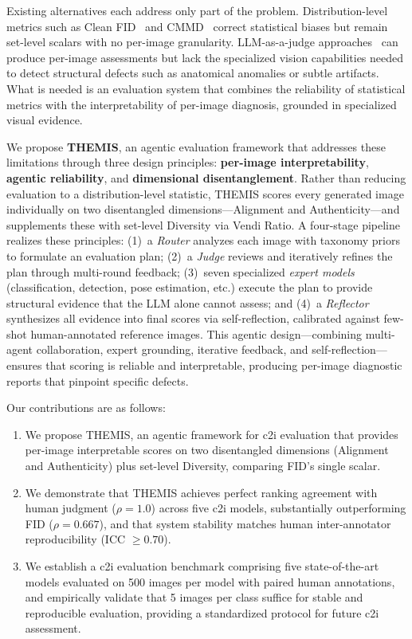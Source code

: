 \documentclass[letterpaper]{article}
\begin{document}
Existing alternatives each address only part of the problem. Distribution-level metrics such as Clean FID~\citep{parmar2021cleanfid} and CMMD~\citep{jayasumana2024rethinking} correct statistical biases but remain set-level scalars with no per-image granularity. LLM-as-a-judge approaches~\citep{zheng2023judging} can produce per-image assessments but lack the specialized vision capabilities needed to detect structural defects such as anatomical anomalies or subtle artifacts. What is needed is an evaluation system that combines the reliability of statistical metrics with the interpretability of per-image diagnosis, grounded in specialized visual evidence.

We propose \textbf{THEMIS}, an agentic evaluation framework that addresses these limitations through three design principles: \textbf{per-image interpretability}, \textbf{agentic reliability}, and \textbf{dimensional disentanglement}. Rather than reducing evaluation to a distribution-level statistic, THEMIS scores every generated image individually on two disentangled dimensions---Alignment and Authenticity---and supplements these with set-level Diversity via Vendi Ratio. A four-stage pipeline realizes these principles: (1)~a \emph{Router} analyzes each image with taxonomy priors to formulate an evaluation plan; (2)~a \emph{Judge} reviews and iteratively refines the plan through multi-round feedback; (3)~seven specialized \emph{expert models} (classification, detection, pose estimation, etc.) execute the plan to provide structural evidence that the LLM alone cannot assess; and (4)~a \emph{Reflector} synthesizes all evidence into final scores via self-reflection, calibrated against few-shot human-annotated reference images. This agentic design---combining multi-agent collaboration, expert grounding, iterative feedback, and self-reflection---ensures that scoring is reliable and interpretable, producing per-image diagnostic reports that pinpoint specific defects.

Our contributions are as follows:
\begin{enumerate}
\item We propose THEMIS, an agentic framework for c2i evaluation that provides per-image interpretable scores on two disentangled dimensions (Alignment and Authenticity) plus set-level Diversity, comparing FID's single scalar.
\item We demonstrate that THEMIS achieves perfect ranking agreement with human judgment ($\rho = 1.0$) across five c2i models, substantially outperforming FID ($\rho = 0.667$), and that system stability matches human inter-annotator reproducibility (ICC $\geq 0.70$).
\item We establish a c2i evaluation benchmark comprising five state-of-the-art models evaluated on 500 images per model with paired human annotations, and empirically validate that 5 images per class suffice for stable and reproducible evaluation, providing a standardized protocol for future c2i assessment.
\end{enumerate}
\end{document}
